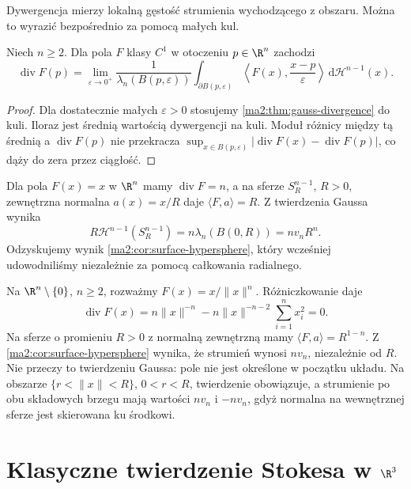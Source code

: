 Dywergencja mierzy lokalną gęstość strumienia
wychodzącego z obszaru. Można to wyrazić
bezpośrednio za pomocą małych kul.

\begin{wniosek}
\label{ma2:cor:divergence-local-flux}
Niech $n\ge2$. Dla pola $F$ klasy $C^1$ w otoczeniu
$p\in\R^n$ zachodzi
\[
 \operatorname{div}F(p)=
 \lim_{\varepsilon\to0^+}
 \frac{1}{\lambda_n(B(p,\varepsilon))}
 \int_{\partial B(p,\varepsilon)}
 \left\langle F(x),\frac{x-p}{\varepsilon}\right\rangle
 \,\mathrm d\mathcal H^{n-1}(x).
\]
\end{wniosek}
\begin{proof}
Dla dostatecznie małych $\varepsilon>0$
stosujemy \ref{ma2:thm:gauss-divergence} do kuli.
Iloraz jest średnią wartością dywergencji
na kuli. Moduł różnicy między tą średnią
a $\operatorname{div}F(p)$ nie przekracza
$\sup_{x\in B(p,\varepsilon)}
|\operatorname{div}F(x)-\operatorname{div}F(p)|$,
co dąży do zera przez ciągłość.
\end{proof}

\begin{przyklad}
\label{ma2:ex:gauss-radial}
Dla pola $F(x)=x$ w $\R^n$ mamy
$\operatorname{div}F=n$, a na sferze
$S_R^{n-1}$, $R>0$, zewnętrzna normalna
$a(x)=x/R$ daje $\langle F,a\rangle=R$.
Z twierdzenia Gaussa wynika
\[
 R\mathcal H^{n-1}(S_R^{n-1})
 =n\lambda_n(B(0,R))=nv_nR^n.
\]
Odzyskujemy wynik
\ref{ma2:cor:surface-hypersphere},
który wcześniej udowodniliśmy niezależnie
za pomocą całkowania radialnego.
\end{przyklad}

\begin{przyklad}
\label{ma2:ex:gauss-singular}
Na $\R^n\setminus\{0\}$, $n\ge2$, rozważmy
$F(x)=x/\|x\|^n$. Różniczkowanie daje
\[
 \operatorname{div}F(x)
 =n\|x\|^{-n}-n\|x\|^{-n-2}
   \sum_{i=1}^n x_i^2=0.
\]
Na sferze o promieniu $R>0$ z normalną
zewnętrzną mamy $\langle F,a\rangle=R^{1-n}$.
Z \ref{ma2:cor:surface-hypersphere}
wynika, że strumień wynosi $nv_n$,
niezależnie od $R$.
Nie przeczy to twierdzeniu Gaussa:
pole nie jest określone w początku układu.
Na obszarze $\{r<\|x\|<R\}$, $0<r<R$,
twierdzenie obowiązuje, a strumienie po
obu składowych brzegu mają wartości $nv_n$
i $-nv_n$, gdyż normalna na wewnętrznej
sferze jest skierowana ku środkowi.
\end{przyklad}

\section{Klasyczne twierdzenie Stokesa w \texorpdfstring{$\R^3$}{R3}}

